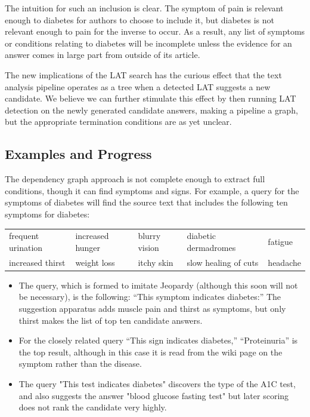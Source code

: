 \documentclass[12pt,letterpaper]{article}
\begin{document}
The intuition for such an inclusion is clear. The symptom of pain is relevant enough to diabetes for authors to choose to include it, but diabetes is not relevant enough to pain for the inverse to occur. As a result, any list of symptoms or conditions relating to diabetes will be incomplete unless the evidence for an answer comes in large part from outside of its article.

The new implications of the LAT search has the curious effect that the text analysis pipeline operates as a tree when a detected LAT suggests a new candidate. We believe we can further stimulate this effect by then running LAT detection on the newly generated candidate answers, making a pipeline a graph, but the appropriate termination conditions are as yet unclear.

\subsection{Examples and Progress}
The dependency graph approach is not complete enough to extract full conditions, though it can find symptoms and signs. For example, a query for the symptoms of diabetes will find the source text that includes the following ten symptoms for diabetes:

\medskip
\begin{tabular}{lllll}
frequent urination & increased hunger & blurry vision & 
diabetic dermadromes & fatigue \\
increased thirst & weight loss & itchy skin & slow healing of cuts & headache  \\
\end{tabular}
\medskip

\begin{itemize}
\item The query, which is formed to imitate Jeopardy (although this soon will not be necessary), is the following: ``This symptom indicates 
diabetes:'' The suggestion apparatus adds muscle pain and thirst as symptoms, but only thirst makes the list of top ten candidate answers.
\item For the closely related query ``This sign indicates diabetes,'' ``Proteinuria'' is the top result, although in this case it is read from the wiki page on the symptom rather than the disease.
\item The query "This test indicates diabetes" discovers the type of the A1C test, and also suggests the answer "blood glucose fasting test" but later scoring does not rank the candidate very highly.
\end{itemize}
\end{document}
